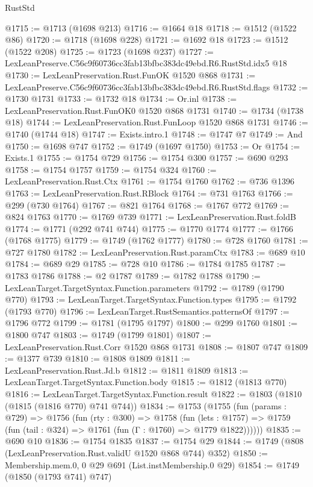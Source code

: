 \begin{lexlean}{RustStd}
\begin{coremodule}
@1715 := @1713 (@1698 @213)
@1716 := @1664 @18
@1718 := @1512 (@1522 @86)
@1720 := @1718 (@1698 @228)
@1721 := @1692 @18
@1723 := @1512 (@1522 @208)
@1725 := @1723 (@1698 @237)
@1727 := LexLeanPreserve.C56c9f60736cc3fab13bfbc383dc49ebd.R6.RustStd.idx5 @18
@1730 := LexLeanPreservation.Rust.FunOK @1520 @868
@1731 := LexLeanPreserve.C56c9f60736cc3fab13bfbc383dc49ebd.R6.RustStd.flags
@1732 := @1730 @1731
@1733 := @1732 @18
@1734 := Or.inl
@1738 := LexLeanPreservation.Rust.FunOK0 @1520 @868 @1731
@1740 := @1734 (@1738 @18)
@1744 := LexLeanPreservation.Rust.FunLoop @1520 @868 @1731
@1746 := @1740 (@1744 @18)
@1747 := Exists.intro.{1}
@1748 := @1747 @7
@1749 := And
@1750 := @1698 @747
@1752 := @1749 (@1697 @1750)
@1753 := Or
@1754 := Exists.{1}
@1755 := @1754 @729
@1756 := @1754 @300
@1757 := @690 @293
@1758 := @1754 @1757
@1759 := @1754 @324
@1760 := LexLeanPreservation.Rust.Ctx
@1761 := @1754 @1760
@1762 := @736 @1396
@1763 := LexLeanPreservation.Rust.RBlock
@1764 := @731 @1763
@1766 := @299 (@730 @1764)
@1767 := @821 @1764
@1768 := @1767 @772
@1769 := @824 @1763
@1770 := @1769 @739
@1771 := LexLeanPreservation.Rust.foldB
@1774 := @1771 (@292 @741 @744)
@1775 := @1770 @1774
@1777 := @1766 (@1768 @1775)
@1779 := @1749 (@1762 @1777)
@1780 := @728 @1760
@1781 := @727 @1780
@1782 := LexLeanPreservation.Rust.paramCtx
@1783 := @689 @10
@1784 := @689 @29
@1785 := @728 @10
@1786 := @1784 @1785
@1787 := @1783 @1786
@1788 := @2 @1787
@1789 := @1782 @1788
@1790 := LexLeanTarget.TargetSyntax.Function.parameters
@1792 := @1789 (@1790 @770)
@1793 := LexLeanTarget.TargetSyntax.Function.types
@1795 := @1792 (@1793 @770)
@1796 := LexLeanTarget.RustSemantics.patternsOf
@1797 := @1796 @772
@1799 := @1781 (@1795 @1797)
@1800 := @299 @1760
@1801 := @1800 @747
@1803 := @1749 (@1799 @1801)
@1807 := LexLeanPreservation.Rust.Corr @1520 @868 @1731
@1808 := @1807 @747
@1809 := @1377 @739
@1810 := @1808 @1809
@1811 := LexLeanPreservation.Rust.Jd.b
@1812 := @1811 @1809
@1813 := LexLeanTarget.TargetSyntax.Function.body
@1815 := @1812 (@1813 @770)
@1816 := LexLeanTarget.TargetSyntax.Function.result
@1822 := @1803 (@1810 (@1815 (@1816 @770) @741 @744))
@1834 := @1753
    (@1755
      (fun (params : @729) =>
      @1756
        (fun (rty : @300) =>
        @1758
          (fun (lets : @1757) =>
          @1759 (fun (tail : @324) => @1761 (fun (Γ : @1760) => @1779 @1822))))))
@1835 := @690 @10
@1836 := @1754 @1835
@1837 := @1754 @29
@1844 := @1749 (@808 (LexLeanPreservation.Rust.validU @1520 @868 @744) @352)
@1850 := Membership.mem.{0, 0} @29 @691 (List.instMembership.{0} @29)
@1854 := @1749 (@1850 (@1793 @741) @747)

\end{coremodule}
\end{lexlean}
